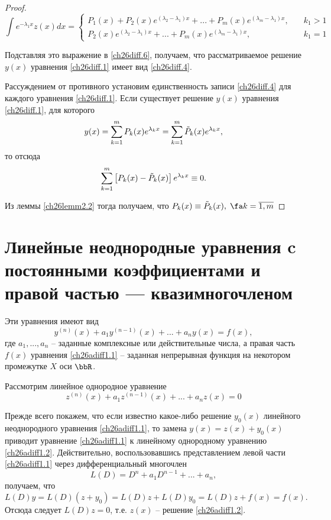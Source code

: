 \begin{proof}
$$
\int e^{-\lambda_1x}z(x)dx = \begin{cases}
P_1(x)+P_2(x)e^{(\lambda_2-\lambda_1)x}+...+P_m(x)e^{(\lambda_m-\lambda_1)x},\quad &k_1>1\\
P_2(x)e^{(\lambda_2-\lambda_1)x}+...+P_m(x)e^{(\lambda_m-\lambda_1)x},\quad &k_1=1
\end{cases}
$$

Подставляя это выражение в \eqref{ch26diff.6}, получаем, что рассматриваемое решение $y(x)$ уравнения \eqref{ch26diff.1} имеет вид \eqref{ch26diff.4}.

Рассуждением от противного установим единственность записи \eqref{ch26diff.4} для каждого уравнения \eqref{ch26diff.1}. Если существует решение $y(x)$ уравнения \eqref{ch26diff.1}, для которого
$$
y(x)=\sum_{k=1}^{m}\limits P_k(x)e^{\lambda_kx}=\sum_{k=1}^{m}\limits \tilde{P}_k(x)e^{\lambda_kx},
$$
то отсюда
$$
\sum_{k=1}^{m}\limits\left[P_k(x)-\tilde{P}_k(x)\right]e^{\lambda_kx}\equiv 0.
$$

Из леммы \ref{ch26lemm2.2} тогда получаем, что $P_k(x)\equiv\tilde{P}_k(x),\; \fa k= \overline{1,m}$
\end{proof}

\section{Линейные неоднородные уравнения c постоянными коэффициентами и правой частью --- квазимногочленом}
Эти уравнения имеют вид
\begin{equation} \label{ch26adiff1.1}
y^{(n)}(x)+a_1y^{(n-1)}(x)+...+a_ny(x)=f(x),
\end{equation}
где $a_1,...,a_n$ -- заданные комплексные или действительные числа, а правая часть $f(x)$ уравнения \eqref{ch26adiff1.1} -- заданная непрерывная функция на некотором промежутке $X$ оси $\bbR$.

Рассмотрим линейное однородное уравнение
\begin{equation}\label{ch26adiff1.2}
z^{(n)}(x)+a_1z^{(n-1)}(x)+...+a_nz(x)=0
\end{equation}

Прежде всего покажем, что если известно какое-либо решение $y_0(x)$ линейного неоднородного уравнения \eqref{ch26adiff1.1}, то замена $y(x)=z(x)+y_0(x)$ приводит уравнение \eqref{ch26adiff1.1} к линейному однородному уравнению \eqref{ch26adiff1.2}. Действительно, воспользовавшись представлением левой части \eqref{ch26adiff1.1} через дифференциальный многочлен
\begin{equation}\label{ch26adiff1.3}
L(D)=D^n+a_1D^{n-1}+...+a_n,
\end{equation}
получаем, что
$$
L(D)y=L(D)(z+y_0)=L(D)z+L(D)y_0=L(D)z+f(x)=f(x).
$$
Отсюда следует $L(D)z=0$, т.е. $z(x)$ -- решение \eqref{ch26adiff1.2}.


